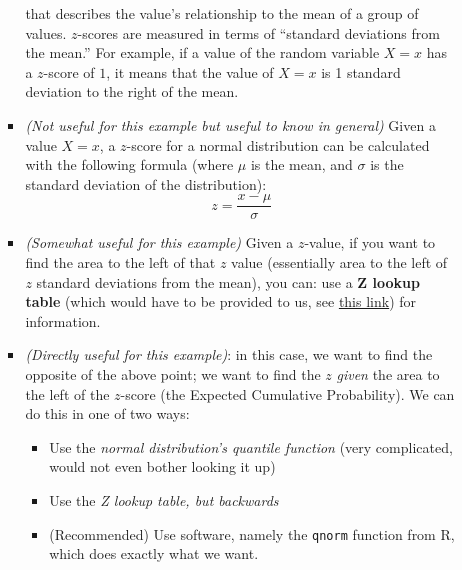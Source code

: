 \documentclass[12pt]{article}
\begin{document}
\begin{itemize}
\begin{enumerate}
\begin{itemize}
			                  that describes the value's relationship to the mean
			                  of a group of values. $z$-scores are
			                  measured in terms of ``standard deviations from the
			                  mean.'' For example, if a value of the random
			                  variable $X = x$ has a $z$-score of $1$, it means that
			                  the value of $X = x$ is 1 standard deviation to the
			                  right of the mean.
			            \item \emph{(Not useful for this example but useful to
				                  know in general)} Given a value $X = x$, a
			                  $z$-score for a normal distribution can be
			                  calculated with the following formula (where
			                  $\mu$ is the mean, and $\sigma$ is the standard
			                  deviation of the
			                  distribution):
			                  \[
				                  z = \frac{x - \mu}{\sigma}
			                  \]
			            \item \emph{(Somewhat useful for this example)} Given a $z$-value,
			                  if you want to find the area to the left of that
			                  $z$ value (essentially area to the left of $z$ standard
			                  deviations from the mean), you can: use a
			                  \textbf{Z lookup table} (which would have to be
			                  provided to us, see
			                  \href{https://www.ztable.net/}{this link}) for
			                  information.
			            \item \emph{(Directly useful for this example)}: in this case,
			                  we want to find the opposite of the above point; we want to
			                  find the $z$ \emph{given} the area to the left of the $z$-score
			                  (the Expected Cumulative Probability). We can do this in one of
			                  two ways:
			                  \begin{itemize}
				                  \item Use the \emph{normal distribution's quantile function} (very complicated, would not even bother looking it up)
				                  \item Use the \emph{Z lookup table, but backwards}
				                  \item (Recommended) Use software, namely the \verb|qnorm| function from R, which does exactly what we want.
			                  \end{itemize}
		            \end{itemize}
	      \end{enumerate}
\end{itemize}
\end{document}
